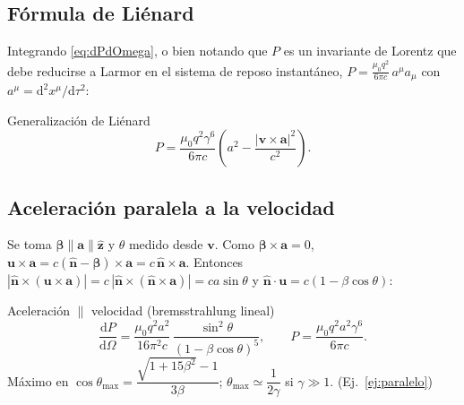 \documentclass[11pt,a4paper]{article}
\newcommand{\nh}{\hat{\mathbf n}}
\newcommand{\bv}{\mathbf v}
\newcommand{\av}{\mathbf a}
\newcommand{\uv}{\mathbf u}
\newcommand{\dd}{\mathrm d}
\newcommand{\bbeta}{\bm\beta}
\theoremstyle{remark}
\begin{document}
\subsection{Fórmula de Liénard}

Integrando \eqref{eq:dPdOmega}, o bien notando que $P$ es un invariante de Lorentz que debe reducirse
a Larmor en el sistema de reposo instantáneo, $P=\frac{\mu_0q^2}{6\pi c}\,a^\mu a_\mu$ con
$a^\mu=\dd^2x^\mu/\dd\tau^2$:
\begin{resbox}{Generalización de Liénard}
\begin{equation}
P=\frac{\mu_0q^2\gamma^6}{6\pi c}\left(a^2-\frac{|\bv\times\av|^2}{c^2}\right).
\label{eq:lienard}
\end{equation}
\end{resbox}

\subsection{Aceleración paralela a la velocidad}

Se toma $\bbeta\parallel\av\parallel\hat{\mathbf z}$ y $\theta$ medido desde $\bv$. Como
$\bbeta\times\av=0$, $\uv\times\av=c(\nh-\bbeta)\times\av=c\,\nh\times\av$. Entonces
$|\nh\times(\uv\times\av)|=c\,|\nh\times(\nh\times\av)|=ca\sin\theta$ y
$\nh\cdot\uv=c(1-\beta\cos\theta)$:
\begin{resbox}{Aceleración $\parallel$ velocidad (bremsstrahlung lineal)}
\begin{equation}
\frac{\dd P}{\dd\Omega}=\frac{\mu_0q^2a^2}{16\pi^2c}\,\frac{\sin^2\theta}{(1-\beta\cos\theta)^5},
\qquad P=\frac{\mu_0q^2a^2\gamma^6}{6\pi c}.
\label{eq:paralelo}
\end{equation}
Máximo en $\cos\theta_{\max}=\dfrac{\sqrt{1+15\beta^2}-1}{3\beta}$;\quad
$\theta_{\max}\simeq\dfrac1{2\gamma}$ si $\gamma\gg1$. \quad (Ej.~\ref{ej:paralelo})
\end{resbox}
\end{document}
